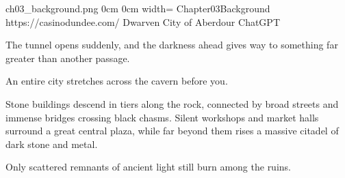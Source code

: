 	{ch03_background.png}		%
	{0cm}						%
	{0cm}						%
	{width=\paperwidth}			%
	{Chapter03Background}		%
	{https://casinodundee.com/}	%
	{Dwarven City of Aberdour}	%
	{ChatGPT}					%
	

\begin{DndReadAloud}
	The tunnel opens suddenly, and the darkness ahead gives way to something far greater than another passage.

	An entire city stretches across the cavern before you.

	Stone buildings descend in tiers along the rock, connected by broad streets and immense bridges crossing black chasms. Silent workshops and market halls surround a great central plaza, while far beyond them rises a massive citadel of dark stone and metal.

	Only scattered remnants of ancient light still burn among the ruins.
\end{DndReadAloud}



